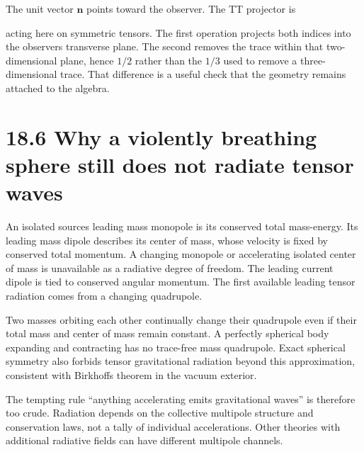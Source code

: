 \documentclass[
  11pt,
  letterpaper,
  oneside,
  openany]{scrbook}
\begin{document}
The unit vector \(\mathbf n\) points toward the observer. The TT
projector is

\begin{center}
\begingroup
{}
\ifdim\wd\grmathbox>\linewidth
\resizebox{\linewidth}{!}{\usebox{\grmathbox}}
\else\usebox{\grmathbox}\fi
\endgroup
\end{center}

acting here on symmetric tensors. The first operation projects both
indices into the observer\textquotesingle s transverse plane. The second
removes the trace within that two-dimensional plane, hence \(1/2\)
rather than the \(1/3\) used to remove a three-dimensional trace. That
difference is a useful check that the geometry remains attached to the
algebra.

\hypertarget{why-a-violently-breathing-sphere-still-does-not-radiate-tensor-waves}{%
\section{18.6 Why a violently breathing sphere still does not radiate
tensor
waves}\label{why-a-violently-breathing-sphere-still-does-not-radiate-tensor-waves}}

An isolated source\textquotesingle s leading mass monopole is its
conserved total mass-energy. Its leading mass dipole describes its
center of mass, whose velocity is fixed by conserved total momentum. A
changing monopole or accelerating isolated center of mass is unavailable
as a radiative degree of freedom. The leading current dipole is tied to
conserved angular momentum. The first available leading tensor radiation
comes from a changing quadrupole.

Two masses orbiting each other continually change their quadrupole even
if their total mass and center of mass remain constant. A perfectly
spherical body expanding and contracting has no trace-free mass
quadrupole. Exact spherical symmetry also forbids tensor gravitational
radiation beyond this approximation, consistent with
Birkhoff\textquotesingle s theorem in the vacuum exterior.

The tempting rule ``anything accelerating emits gravitational waves'' is
therefore too crude. Radiation depends on the collective multipole
structure and conservation laws, not a tally of individual
accelerations. Other theories with additional radiative fields can have
different multipole channels.
\end{document}
